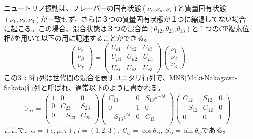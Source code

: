 \documentclass[11pt]{jreport}
\begin{document}


ニュートリノ振動は、フレーバーの固有状態$(\nu_{e}, \nu_{\mu}, \nu_{\tau})$と質量固有状態$(\nu_{1}, \nu_{2}, \nu_{3})$が一致せず、さらに３つの質量固有状態が１つに縮退してない場合に起こる。この場合、混合状態は３つの混合角$(\theta_{12}, \theta_{23}, \theta_{13})$と１つのCP複素位相$\delta$を用いて以下の用に記述することができる。
\begin{equation}
\begin{pmatrix}
\nu_{e}\\
\nu_{\mu}\\
\nu_{\tau}
\end{pmatrix}
=
\begin{pmatrix}
U_{e1} & U_{e2} & U_{e3}\\
U_{\mu1} & U_{\mu2} & U_{\mu3}\\
U_{\tau1} & U_{\tau2} & U_{\tau3}
\end{pmatrix}
\begin{pmatrix}
\nu_{1}\\
\nu_{2}\\
\nu_{3}
\end{pmatrix}
\end{equation}
この$3\times3$行列は世代間の混合を表すユニタリ行列で、MNS(Maki-Nakagawa-Sakata)行列と呼ばれ\cite{mns}、通常以下のように書かれる。
\begin{equation}
U_{\alpha i} =
\begin{pmatrix}
1 & 0 & 0 \\
0 & C_{23} & S_{23} \\
0 & -S_{23} & C_{23} \\
\end{pmatrix}
\begin{pmatrix}
C_{13} & 0 & S_{13}e^{-i\delta} \\
0 & 1 & 0 \\
-S_{13}e^{i\delta} & 0 & C_{13} \\
\end{pmatrix}
\begin{pmatrix}
C_{12} & S_{12} & 0 \\
-S_{12} & C_{12} & 0 \\
0 & 0 & 1 \\
\end{pmatrix}
\end{equation}
ここで、$\alpha = (e, \mu, \tau),\ i = (1, 2, 3),\ C_{ij}=\cos\theta_{ij},\ S_{ij}=\sin\theta_{ij}$である。
\end{document}
